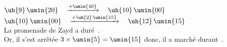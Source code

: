    $\uh{9}\,\umin{20} \quad \xrightarrow{+\umin{40}} \quad \uh{10}\,\umin{00}$ \\
   $\uh{10}\,\umin{00} \quad \xrightarrow{+\uh{2} \, \umin{15}} \quad \uh{12}\,\umin{15}$ \\
   La promenade de Zayd a duré \,. \\
   Or, il s'est arrêtée $3\times\umin{5} =\umin{15}$ donc, {\blue il a marché durant \,}. \\
